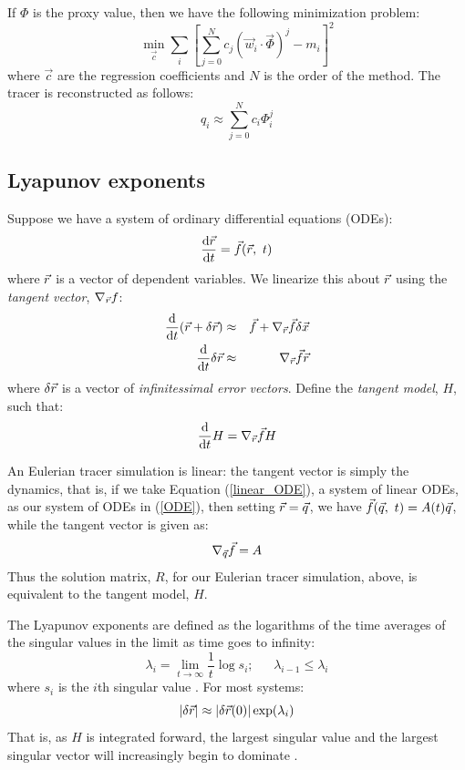 \documentclass{article}
\begin{document}
If $\Phi$ is the proxy value, then we have the following minimization
problem:
\begin{equation}
	\min_{\vec c} \sum_i \left [ \sum_{j=0}^N c_j (\vec w_i \cdot \vec \Phi)^j - m_i \right ]^2
\end{equation}
where $\vec c$ are the regression coefficients and $N$ is the order of the
method. The tracer is reconstructed as follows:
\begin{equation}
	q_i \approx \sum_{j=0}^N c_i \Phi_i^j
\end{equation}

\subsection{Lyapunov exponents}

Suppose we have a system of ordinary differential equations (ODEs):
\begin{equation}
	\frac{\mathrm d \vec r}{\mathrm d t} = \vec f(\vec r, ~ t)
	\label{ODE}
\end{equation}
where $\vec r$ is a vector of dependent variables.
We linearize this about $\vec r$ using the {\it tangent vector},
$\nabla_{\vec r} f$:
\begin{eqnarray}
\frac{\mathrm d}{\mathrm d t} (\vec r + \delta \vec r) & \approx & \vec f + 
	\nabla_{\vec r} \vec f \delta \vec x \\
	\frac{\mathrm d}{\mathrm d t} \delta \vec r & \approx & \nabla_{\vec r} \vec f \vec r
\end{eqnarray}
where $\delta \vec r$ is a vector of {\it infinitessimal error vectors}.
Define the {\it tangent model}, $H$, such that:
\begin{equation} 
	\frac{\mathrm d}{\mathrm d t} H = \nabla_{\vec r} \vec f H \\
\end{equation}

An Eulerian tracer simulation is linear: the tangent vector is simply
the dynamics, that is,
if we take Equation (\ref{linear_ODE}), a system of linear ODEs,
as our system of ODEs in
(\ref{ODE}), then setting $\vec r=\vec q$, 
we have $\vec f(\vec q, ~t)=A(t) \vec q$,
while the tangent vector is given as:
\begin{equation}
	\nabla_{\vec q} \vec f = A
\end{equation}
Thus the solution matrix, $R$, for our Eulerian tracer simulation, above,
is equivalent to the tangent model, $H$.

The Lyapunov exponents are defined as the logarithms of the time averages
of the singular values in the limit as time goes to infinity:
\begin{equation}
\lambda_i = \lim_{t \rightarrow \infty} \frac{1}{t} \log s_i;
~~~~~~~\lambda_{i-1} \le \lambda_i
\end{equation}
where $s_i$ is the $i$th singular value \citep{Ott1993}.
For most systems:
\begin{equation}
|\delta \vec r| \approx |\delta \vec r(0) | \exp(\lambda_i)
\label{lambda1}
\end{equation}
That is, as $H$ is integrated forward, the largest singular value and
the largest singular vector will increasingly begin to dominate
\citep{Ott1993}.
\end{document}
